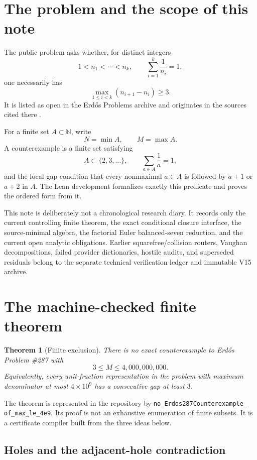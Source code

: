 \documentclass[11pt]{article}
\newtheorem{theorem}{Theorem}[section]
\theoremstyle{definition}
\newcommand{\N}{\mathbb N}
\newcommand{\1}{\mathbf 1}
\begin{document}
\section{The problem and the scope of this note}

The public problem asks whether, for distinct integers
\[
1<n_1<\cdots<n_k,\qquad \sum_{i=1}^k\frac1{n_i}=1,
\]
one necessarily has
\[
\max_{1\le i<k}(n_{i+1}-n_i)\ge3.
\]
It is listed as open in the Erd\H{o}s Problems archive and originates in the sources
cited there \cite{ErdosGraham1980,ErdosProblems287}.

For a finite set $A\subset\N$, write
\[
N=\min A,\qquad M=\max A.
\]
A counterexample is a finite set satisfying
\[
A\subset\{2,3,\dots\},\qquad \sum_{a\in A}\frac1a=1,
\]
and the local gap condition that every nonmaximal $a\in A$ is followed by $a+1$ or $a+2$
in $A$.  The Lean development formalizes exactly this predicate and proves the ordered
form from it.

This note is deliberately not a chronological research diary.  It records only the
current controlling finite theorem, the exact conditional closure interface, the
source-minimal algebra, the factorial Euler balanced-seven reduction, and the current open
analytic obligations.  Earlier squarefree/collision routers, Vaughan decompositions, failed
provider dictionaries, hostile audits, and superseded residuals belong to the separate technical
verification ledger and immutable V15 archive.

\section{The machine-checked finite theorem}

\begin{theorem}[Finite exclusion]
There is no exact counterexample to Erd\H{o}s Problem \#287 with
\[
3\le M\le4{,}000{,}000{,}000.
\]
Equivalently, every unit-fraction representation in the problem with maximum denominator
at most $4\times10^9$ has a consecutive gap at least $3$.
\end{theorem}

The theorem is represented in the repository by
\texttt{no\_Erdos287Counterexample\_}\\\texttt{of\_max\_le\_4e9}.  Its proof is not an exhaustive
enumeration of finite subsets.  It is a certificate compiler built from the three ideas
below.

\subsection{Holes and the adjacent-hole contradiction}
\end{document}
